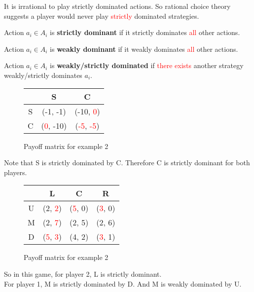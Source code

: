 \documentclass[11pt]{article}
\newcommand{\red}[1]{\textcolor{red}{#1}}
\begin{document}
		\begin{corollary}
			It is irrational to play strictly dominated actions. So rational choice theory suggests a player would never play \red{strictly} dominated strategies.
		\end{corollary}
		
		\begin{definition}
			Action $a_i \in A_i$ is \textbf{strictly dominant} if it strictly dominates \red{all} other actions.
		\end{definition}
		
		\begin{definition}
			Action $a_i \in A_i$ is \textbf{weakly dominant} if it weakly dominates \red{all} other actions.
		\end{definition}
		
		\begin{definition}
			Action $a_i \in A_i$ is \textbf{weakly/strictly dominated} if \red{there exists} another strategy weakly/strictly dominates $a_i$.
		\end{definition}
		
		\begin{example}
			\begin{figure}[h]
				\centering
				\begin{tabular}{c|c|c}
					 & S & C \\
					\hline
					S & (-1, -1) & (-10, \red{0})\\
					\hline
					C & (\red{0}, -10) & (\red{-5}, \red{-5})
				\end{tabular}
				\caption{Payoff matrix for example 2}
			\end{figure}
			Note that S is strictly dominated by C. Therefore C is strictly dominant for both players.
		\end{example}
		
		\begin{example}
			\begin{figure}[h]
				\centering
				\begin{tabular}{c|c|c|c}
					 & L & C & R\\
					\hline
					U & (2, \red{2}) & (\red{5}, 0) & (\red{3}, 0)\\
					\hline
					M & (2, \red{7}) & (2, 5) & (2, 6)\\
					\hline 
					D & (\red{5}, \red{3}) & (4, 2) & (\red{3}, 1)
				\end{tabular}
				\caption{Payoff matrix for example 2}
			\end{figure}
			So in this game, for player 2, L is strictly dominant. \\For player 1, M is strictly dominated by D. And M is weakly dominated by U.
		\end{example}
		
\end{document}
